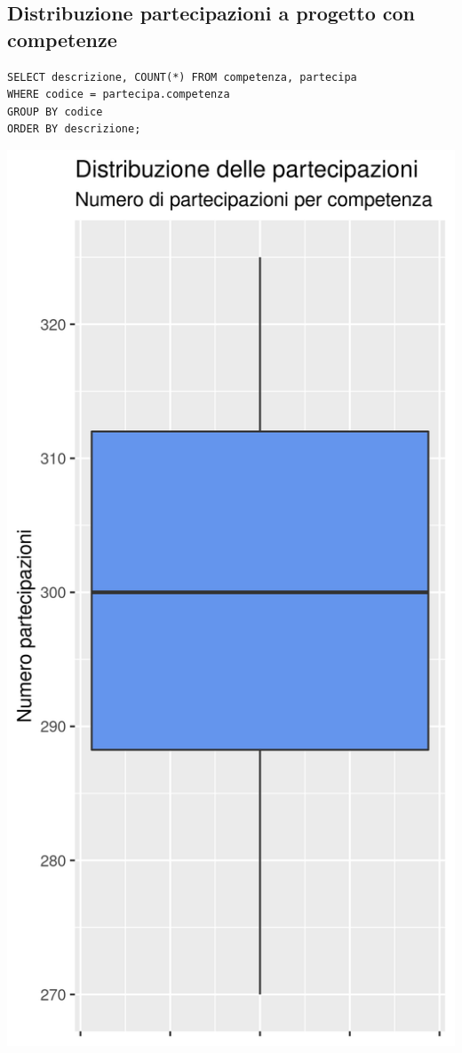 \documentclass{article}
\begin{document}
\subsection{Distribuzione partecipazioni a progetto con competenze}
\begin{verbatim}
SELECT descrizione, COUNT(*) FROM competenza, partecipa 
WHERE codice = partecipa.competenza 
GROUP BY codice 
ORDER BY descrizione;
\end{verbatim}
\begin{center}
\includegraphics[width=.5\textwidth]{plot_dist_partecipazioni_comptenza.png}
\end{center}

\newpage
\end{document}
